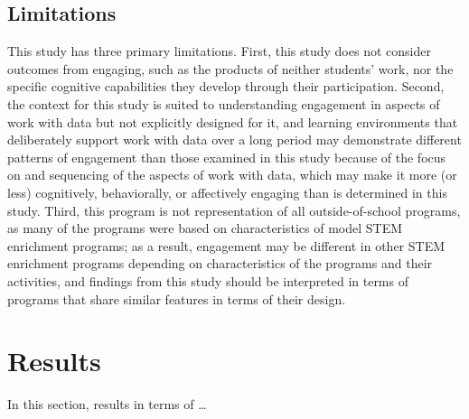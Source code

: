 \documentclass[]{msu-thesis}
\theoremstyle{definition}
\theoremstyle{definition}
\theoremstyle{definition}
\theoremstyle{remark}
\begin{document}
\subsection{Limitations}\label{limitations}

This study has three primary limitations. First, this study does not
consider outcomes from engaging, such as the products of neither
students' work, nor the specific cognitive capabilities they develop
through their participation. Second, the context for this study is
suited to understanding engagement in aspects of work with data but not
explicitly designed for it, and learning environments that deliberately
support work with data over a long period may demonstrate different
patterns of engagement than those examined in this study because of the
focus on and sequencing of the aspects of work with data, which may make
it more (or less) cognitively, behaviorally, or affectively engaging
than is determined in this study. Third, this program is not
representation of all outside-of-school programs, as many of the
programs were based on characteristics of model STEM enrichment
programs; as a result, engagement may be different in other STEM
enrichment programs depending on characteristics of the programs and
their activities, and findings from this study should be interpreted in
terms of programs that share similar features in terms of their design.

\section{Results}\label{results}

In this section, results in terms of \ldots{}
\end{document}
